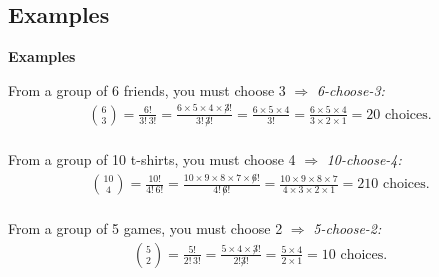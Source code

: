 \documentclass[compress]{beamer}        %
\makeatletter
\newcommand{\tcb}{\textcolor{beamer@blendedblue}}
\makeatother
\begin{document}
\subsection{Examples}
\begin{frame}{\bf \tcb{Examples}}

From a group of 6 friends, you must choose 3 $\Rightarrow$ \emph{6-choose-3:}
\begin{align*}
\binom{6}{3} = \frac{6!}{3! \, 3!} = \frac{6\times5\times4\times\not3!}{3! \, \not3!} = \frac{6\times5\times4}{3!} = \frac{6\times5\times4}{3\times2\times1} = 20 \text{ choices}.\\
\end{align*}

From a group of 10 t-shirts, you must choose 4 $\Rightarrow$ \emph{10-choose-4:}
\begin{align*}
\binom{10}{4} = \frac{10!}{4! \, 6!} = \frac{10\times9\times8\times7\times\not6!}{4! \, \not6!} =
\frac{10\times9\times8\times7}{4\times3\times2\times1} = 210 \text{ choices}.\\
\end{align*}

From a group of 5 games, you must choose 2 $\Rightarrow$ \emph{5-choose-2:}
\begin{align*}
\binom{5}{2} = \frac{5!}{2! \, 3!}  = \frac{5\times4\times\not3!}{2!\not3!} = \frac{5\times4}{2\times1} = 10 \text{ choices}.
\end{align*}

\end{frame}
%
%
%
\end{document}
